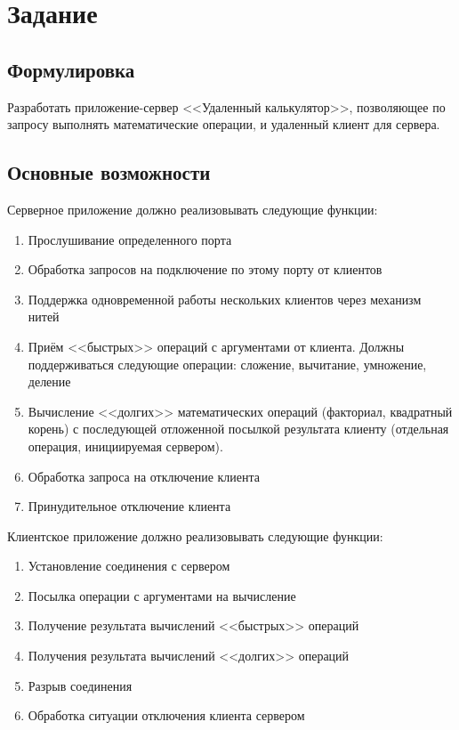 





\tableofcontents
\listoffigures
\listoftables
\newpage

\section{Задание}

\subsection{Формулировка}

Разработать приложение-сервер <<Удаленный калькулятор>>, позволяющее по запросу выполнять математические операции, и удаленный клиент для сервера.

\subsection{Основные возможности}

Серверное приложение должно реализовывать следующие функции:

\begin{enumerate}
	\item Прослушивание определенного порта
	\item Обработка запросов на подключение по этому порту от клиентов
	\item Поддержка одновременной работы нескольких клиентов через механизм нитей
	\item Приём <<быстрых>> операций с аргументами от клиента. Должны поддерживаться следующие операции: сложение, вычитание, умножение,
деление
	\item Вычисление <<долгих>> математических операций (факториал, квадратный корень) с последующей отложенной посылкой результата клиенту (отдельная операция, инициируемая сервером).
	\item Обработка запроса на отключение клиента
	\item Принудительное отключение клиента
\end{enumerate}

Клиентское приложение должно реализовывать следующие функции:

\begin{enumerate}
	\item Установление соединения с сервером
	\item Посылка операции с аргументами на вычисление
	\item Получение результата вычислений <<быстрых>> операций
	\item Получения результата вычислений <<долгих>> операций
	\item Разрыв соединения
	\item  Обработка ситуации отключения клиента сервером
\end{enumerate}

